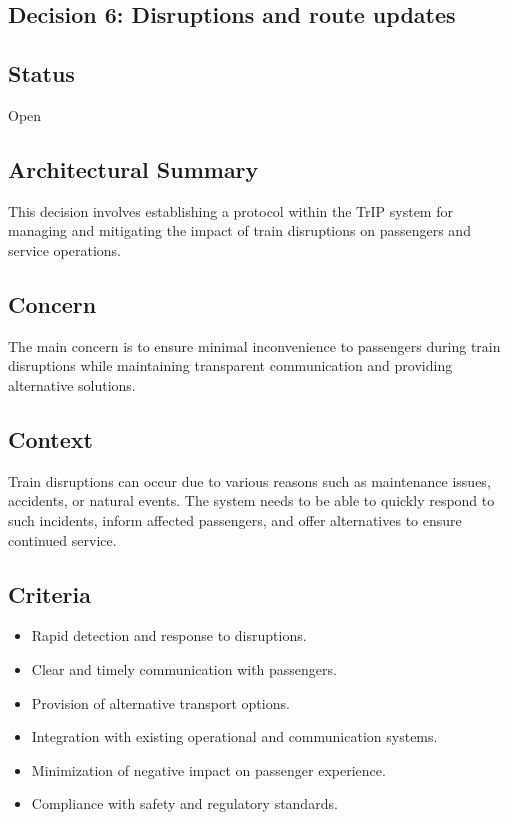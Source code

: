 \subsection{Decision 6: Disruptions and route updates}

\subsection*{Status}
Open

\subsection*{Architectural Summary}
This decision involves establishing a protocol within the TrIP system for managing and mitigating the impact of train disruptions on passengers and service operations.

\subsection*{Concern}
The main concern is to ensure minimal inconvenience to passengers during train disruptions while maintaining transparent communication and providing alternative solutions.

\subsection*{Context}
Train disruptions can occur due to various reasons such as maintenance issues, accidents, or natural events. The system needs to be able to quickly respond to such incidents, inform affected passengers, and offer alternatives to ensure continued service.

\subsection*{Criteria}
\begin{itemize}
    \item Rapid detection and response to disruptions.
    \item Clear and timely communication with passengers.
    \item Provision of alternative transport options.
    \item Integration with existing operational and communication systems.
    \item Minimization of negative impact on passenger experience.
    \item Compliance with safety and regulatory standards.
\end{itemize}

